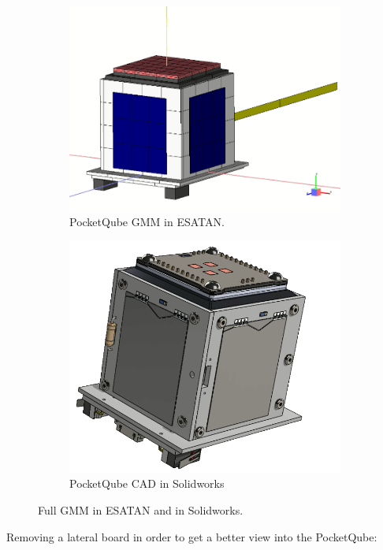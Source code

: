 \begin{figure}[H]
    \centering
    \begin{subfigure}{.5\textwidth}
      \centering
      \includegraphics[width=.6\linewidth]{res/img/5_simulationanalisys/Comparisons/ESATAN/pqfull.PNG}
      \caption{PocketQube GMM in ESATAN.}
      \label{fig:pqfull}
    \end{subfigure}%
    \begin{subfigure}{.5\textwidth}
      \centering
      \includegraphics[width=.5\linewidth]{res/img/5_simulationanalisys/Comparisons/SLDW/pqfull_Solid.PNG}
      \caption{PocketQube CAD in Solidworks}
      \label{fig:pqfullsolid}
    \end{subfigure}
    \caption{Full GMM in ESATAN and in Solidworks.}
    \label{fig:pqfullim}
\end{figure}

Removing a lateral board in order to get a better view into the PocketQube:

